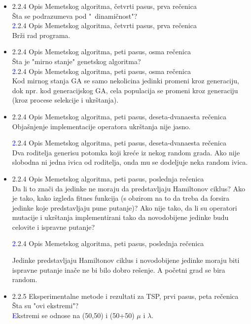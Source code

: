 \documentclass[a4paper]{report}
\newcommand{\odgovor}[1]{\textcolor{blue}{#1}}
\begin{document}
\begin{itemize}
    
    \item 2.2.4 Opis Memetskog algoritma, četvrti pasus, prva rečenica \\
    Šta se podrazumeva pod "\ dinamičnost"?\\
     \odgovor 2.2.4 Opis Memetskog algoritma, četvrti pasus, prva rečenica \\
     Brži rad programa.
    
    
    \item 2.2.4 Opis Memetskog algoritma, peti pasus, osma rečenica \\
    Šta je "mirno stanje" \hspace{0.075cm} genetskog algoritma? \\
     \odgovor  2.2.4 Opis Memetskog algoritma, peti pasus, osma rečenica \\
    Kod mirnog stanja GA se samo nekolicina jedinki promeni kroz generaciju, dok npr. kod generacijskog GA, cela populacija se promeni kroz generaciju (kroz procese selekcije i ukrštanja). \\
    
    \item 2.2.4 Opis Memetskog algoritma, peti pasus, deseta-dvanaesta rečenica \\
    Objašnjenje implementacije operatora ukrštanja nije jasno.
    
     \odgovor 2.2.4 Opis Memetskog algoritma, peti pasus, deseta-dvanaesta rečenica \\
     Dva roditelja generisu potomka koji kreće iz nekog random grada. Ako nije slobodna ni jedna ivica od roditelja, onda mu se dodeljuje neka random ivica.
     
     
    \item 2.2.4 Opis Memetskog algoritma, peti pasus, poslednja rečenica \\
    Da li to znači da jedinke ne moraju da predstavljaju Hamiltonov ciklus? Ako je tako, kako izgleda fitnes funkcija (s obzirom na to da treba da forsira jedinke koje predstavljaju pune putanje)? Ako nije tako, da li su operatori mutacije i ukrštanja implementirani tako da novodobijene jedinke budu celovite i ispravne putanje?
    
     \odgovor 2.2.4 Opis Memetskog algoritma, peti pasus, poslednja rečenica
     
     Jedinke predstavljaju Hamiltonov ciklus i novodobijene jedinke moraju biti ispravne putanje inače ne bi bilo dobro rešenje. A početni grad se bira random.
     
    \item 2.2.5 Eksperimentalne metode i rezultati za TSP, prvi pasus, peta rečenica \\
    Šta su "ovi ekstremi"?\\
    \odgovor
    Ekstremi se odnose na (50,50) i (50+50) $\mu$ i $\lambda$. 
    

\end{itemize}
\end{document}
